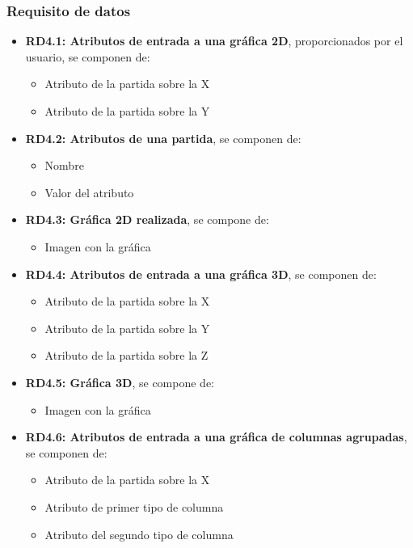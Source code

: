 \subsubsection{Requisito de datos}
\begin{itemize}
	\item \textbf{RD4.1: Atributos de entrada a una gráfica 2D}, proporcionados por el usuario, se componen de:
	\begin{itemize}
		\item Atributo de la partida sobre la X
		\item Atributo de la partida sobre la Y
	\end{itemize}
	
	\item \textbf{RD4.2: Atributos de una partida}, se componen de:
	\begin{itemize}
		\item Nombre
		\item Valor del atributo
	\end{itemize}
	
	\item \textbf{RD4.3: Gráfica 2D realizada}, se compone de:
	\begin{itemize}
		\item Imagen con la gráfica
	\end{itemize}
	
	\item \textbf{RD4.4: Atributos de entrada a una gráfica 3D}, se componen de:
	\begin{itemize}
			\item Atributo de la partida sobre la X
			\item Atributo de la partida sobre la Y
			\item Atributo de la partida sobre la Z
	\end{itemize}
	
	
	\item \textbf{RD4.5: Gráfica 3D}, se compone de:
	\begin{itemize}
			\item Imagen con la gráfica
	\end{itemize}
	
	\item \textbf{RD4.6: Atributos de entrada a una gráfica de columnas agrupadas}, se componen de:
	\begin{itemize}
		\item Atributo de la partida sobre la X
		\item Atributo de primer tipo de columna
		\item Atributo del segundo tipo de columna
	\end{itemize}
	

\end{itemize}
